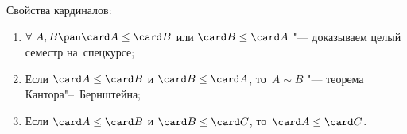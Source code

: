  Свойства кардиналов:
\begin{enumerate}
    \item $\forall\  A,B\pau \card A\leq \card B$ или $\card B\leq \card A$ "--- доказываем целый семестр на~спецкурсе;

    \item Если $\card A\leq \card B$ и $\card B\leq \card A$, то~$A\sim B$ "--- теорема Кантора"--~Бернштейна;

    \item Если $\card A\leq \card B$ и $\card B\leq \card C$, то~$\card A\leq \card C$.
\end{enumerate}

